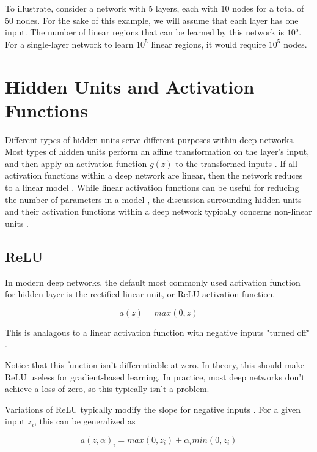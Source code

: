 \documentclass{article}
\begin{document}
To illustrate, consider a network with 5 layers, each with 10 nodes for a total of 50 nodes. For the sake of this example, we will assume that each layer has one input. The number of linear regions that can be learned by this network is \(10^5\). For a single-layer network to learn \(10^5\) linear regions, it would require \(10^5\) nodes. 

\section{Hidden Units and Activation Functions} %

Different types of hidden units serve different purposes within deep networks. Most types of hidden units perform an affine  transformation on the layer's input, and then apply an activation function \(g(z)\) to the transformed inputs \cite{Goodfellow-et-al-2016}. If all activation functions within a deep network are linear, then the network reduces to a linear model \cite{pml1Book}. While linear activation functions can be useful for reducing the number of parameters in a model , the discussion surrounding hidden units and their activation functions within a deep network typically concerns non-linear units \cite{Goodfellow-et-al-2016}. 

\subsection{ReLU}

In modern deep networks, the default most commonly used activation function for hidden layer is the rectified linear unit, or ReLU activation function.

\begin{equation}
    a(z) = max(0, z)
    \label{ReLU-activation}
\end{equation}

This is analagous to a linear activation function with negative inputs "turned off" \cite{pml1Book}. 

Notice that this function isn't differentiable at zero. In theory, this should make ReLU useless for gradient-based learning. In practice, most deep networks don't achieve a loss of zero, so this typically isn't a problem.

Variations of ReLU typically modify the slope for negative inputs \cite{Goodfellow-et-al-2016}. For a given input \(z_i\), this can be generalized as

\begin{equation}
    a(z,\alpha)_i = max(0, z_i) + \alpha_i min(0,z_i)
    \label{generalization-ReLU}
\end{equation}
\end{document}
